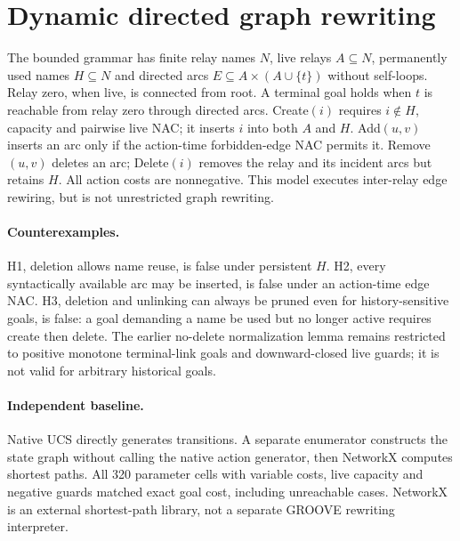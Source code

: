 \documentclass[10pt,a4paper]{article}
\begin{document}
\section{Dynamic directed graph rewriting}
The bounded grammar has finite relay names $N$, live relays $A\subseteq N$, permanently used names $H\subseteq N$ and directed arcs $E\subseteq A\times(A\cup\{t\})$ without self-loops. Relay zero, when live, is connected from root. A terminal goal holds when $t$ is reachable from relay zero through directed arcs. Create$(i)$ requires $i\notin H$, capacity and pairwise live NAC; it inserts $i$ into both $A$ and $H$. Add$(u,v)$ inserts an arc only if the action-time forbidden-edge NAC permits it. Remove$(u,v)$ deletes an arc; Delete$(i)$ removes the relay and its incident arcs but retains $H$. All action costs are nonnegative. This model executes inter-relay edge rewiring, but is not unrestricted graph rewriting.
\paragraph{Counterexamples.} H1, deletion allows name reuse, is false under persistent $H$. H2, every syntactically available arc may be inserted, is false under an action-time edge NAC. H3, deletion and unlinking can always be pruned even for history-sensitive goals, is false: a goal demanding a name be used but no longer active requires create then delete. The earlier no-delete normalization lemma remains restricted to positive monotone terminal-link goals and downward-closed live guards; it is not valid for arbitrary historical goals.
\paragraph{Independent baseline.} Native UCS directly generates transitions. A separate enumerator constructs the state graph without calling the native action generator, then NetworkX computes shortest paths. All 320 parameter cells with variable costs, live capacity and negative guards matched exact goal cost, including unreachable cases. NetworkX is an external shortest-path library, not a separate GROOVE rewriting interpreter.
\end{document}
